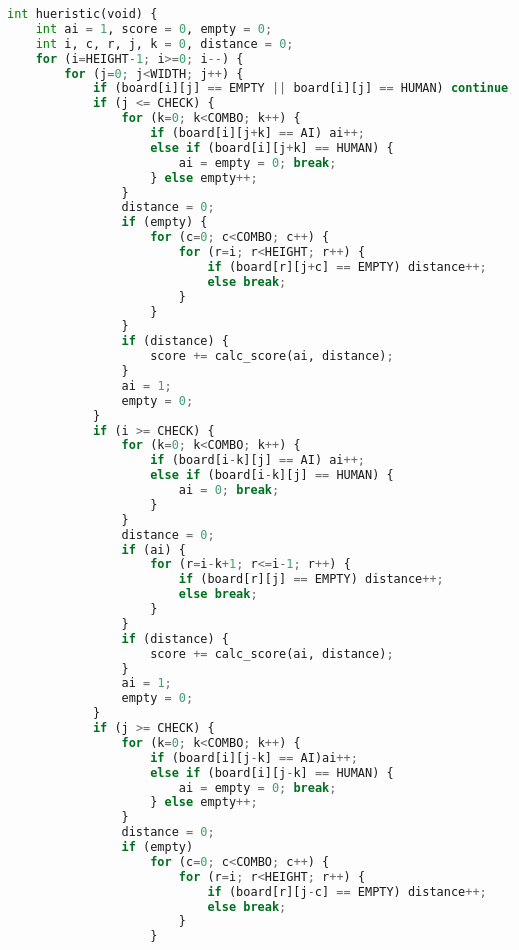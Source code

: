 \documentclass[11pt,letterpaper]{article}
\begin{document}
\begin{lstlisting}[language=Python]
int hueristic(void) {
    int ai = 1, score = 0, empty = 0;
    int i, c, r, j, k = 0, distance = 0;
    for (i=HEIGHT-1; i>=0; i--) {
        for (j=0; j<WIDTH; j++) {
            if (board[i][j] == EMPTY || board[i][j] == HUMAN) continue;
            if (j <= CHECK) {
                for (k=0; k<COMBO; k++) {
                    if (board[i][j+k] == AI) ai++;
                    else if (board[i][j+k] == HUMAN) {
                        ai = empty = 0; break;
                    } else empty++;
                }
                distance = 0;
                if (empty) {
                    for (c=0; c<COMBO; c++) {
                        for (r=i; r<HEIGHT; r++) {
                            if (board[r][j+c] == EMPTY) distance++;
                            else break;
                        }
                    }
                }
                if (distance) {
                    score += calc_score(ai, distance);
                }
                ai = 1;
                empty = 0;
            }
            if (i >= CHECK) {
                for (k=0; k<COMBO; k++) {
                    if (board[i-k][j] == AI) ai++;
                    else if (board[i-k][j] == HUMAN) {
                        ai = 0; break;
                    }
                }
                distance = 0;
                if (ai) {
                    for (r=i-k+1; r<=i-1; r++) {
                        if (board[r][j] == EMPTY) distance++;
                        else break;
                    }
                }
                if (distance) {
                    score += calc_score(ai, distance);
                }
                ai = 1;
                empty = 0;
            }
            if (j >= CHECK) {
                for (k=0; k<COMBO; k++) {
                    if (board[i][j-k] == AI)ai++;
                    else if (board[i][j-k] == HUMAN) {
                        ai = empty = 0; break;
                    } else empty++;
                }
                distance = 0;
                if (empty)
                    for (c=0; c<COMBO; c++) {
                        for (r=i; r<HEIGHT; r++) {
                            if (board[r][j-c] == EMPTY) distance++;
                            else break;
                        }
                    }


\end{lstlisting}
\end{document}
